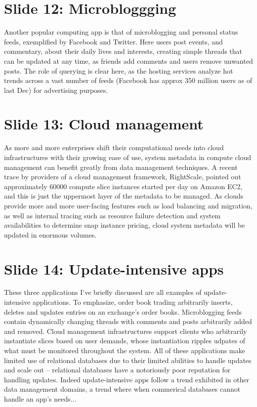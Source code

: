 \documentclass{article}
\begin{document}
\section{Slide 12: Microbloggging}
Another popular computing app is that of microblogging and personal status
feeds, exemplified by Facebook and Twitter. Here users post events, and
commentary, about their daily lives and interests, creating simple threads that
can be updated at any time, as friends add comments and users remove unwanted
posts. The role of querying is clear here, as the hosting services analyze hot
trends across a vast number of feeds (Facebook has approx 350 million users as
of last Dec) for advertising purposes.

\section{Slide 13: Cloud management}
As more and more enterprises shift their computational needs into cloud
infrastructures with their growing ease of use, system metadata in compute cloud
management can benefit greatly from data management techniques. A recent trace
by providers of a cloud management framework, RightScale, pointed out
approximately 60000 compute slice instances started per day on Amazon EC2, and
this is just the uppermost layer of the metadata to be managed. As clouds
provide more and more user-facing features such as load balancing and migration,
as well as internal tracing such as resource failure detection and system
availabilities to determine snap instance pricing, cloud system metadata will be
updated in enormous volumes.

\section{Slide 14: Update-intensive apps}
These three applications I've briefly discussed are all examples of
update-intensive applications. To emphasize, order book trading arbitrarily
inserts, deletes and updates entries on an exchange's order books. Microblogging
feeds contain dynamically changing threads with comments and posts arbitrarily
added and removed. Cloud management infrastructures support clients who
arbitrarily instantiate slices based on user demands, whose instantiation
ripples udpates of what must be monitored throughout the system. All of these
applications make limited use of relational databases due to their limited
abilities to handle updates and scale out -- relational databases have a
notoriously poor reputation for handling updates.  Indeed update-intensive apps
follow a trend exhibited in other data management domains, a trend where when
commerical databases cannot handle an app's needs...
\end{document}
